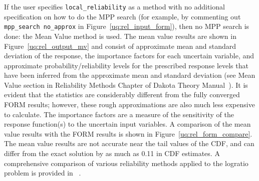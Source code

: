 If the user specifies \texttt{local\_reliability} as a method with no
additional specification on how to do the MPP search (for example, by
commenting out {\tt mpp\_search no\_approx} in
Figure~\ref{uq:rel_input_form}), then no MPP search is done: the Mean
Value method is used. The mean value results are shown in
Figure~\ref{uq:rel_output_mv} and consist of approximate mean and
standard deviation of the response, the importance factors for each
uncertain variable, and approximate probability/reliability levels for
the prescribed response levels that have been inferred from the
approximate mean and standard deviation (see Mean Value section in
Reliability Methods Chapter of Dakota Theory
Manual~\cite{TheoMan}). It is evident that the statistics are
considerably different from the fully converged FORM results; however,
these rough approximations are also much less expensive to
calculate. The importance factors are a measure of the sensitivity of
the response function(s) to the uncertain input variables. A
comparison of the mean value results with the FORM results is shown in
Figure~\ref{uq:rel_form_compare}. The mean value results are not
accurate near the tail values of the CDF, and can differ from the
exact solution by as much as 0.11 in CDF estimates. A comprehensive
comparison of various reliability methods applied to the logratio
problem is provided in ~\cite{Eld06a}.

